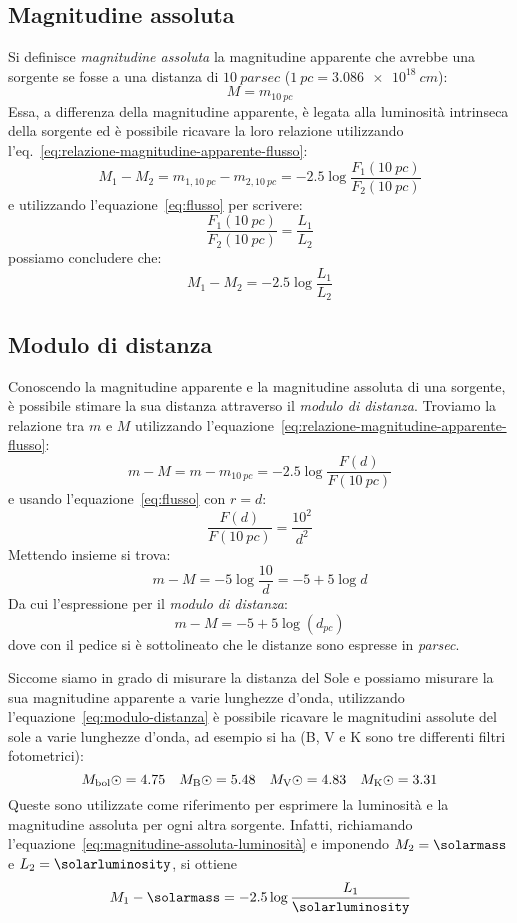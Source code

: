 \subsection{Magnitudine assoluta}\label{sec:magnitudine-assoluta}
Si definisce \emph{magnitudine assoluta} la magnitudine apparente che avrebbe una sorgente se fosse a una distanza di $\SI{10}{parsec}$ ($\SI{1}{pc} = \SI{3.086e18}{cm}$):
\begin{equation}\label{eq:magnitudine-assoluta}
    M = m_{\SI{10}{pc}}
\end{equation}
Essa, a differenza della magnitudine apparente, è legata alla luminosità intrinseca della sorgente ed è possibile ricavare la loro relazione utilizzando l'eq.~\eqref{eq:relazione-magnitudine-apparente-flusso}:
\[
    M_1 - M_2 = m_{1, \SI{10}{pc}} - m_{2, \SI{10}{pc}} = -2.5 \log\frac{F_1 (\SI{10}{pc})}{F_2 (\SI{10}{pc})}
\]
e utilizzando l'equazione~\eqref{eq:flusso} per scrivere:
\[
    \frac{F_1 (\SI{10}{pc})}{F_2 (\SI{10}{pc})} = \frac{L_1}{L_2}
\]
possiamo concludere che:
\begin{equation}\label{eq:magnitudine-assoluta-luminosità}
    M_1 - M_2 = -2.5 \log\frac{L_1}{L_2}
\end{equation}

\subsection{Modulo di distanza}
Conoscendo la magnitudine apparente e la magnitudine assoluta di una sorgente, è possibile stimare la sua distanza attraverso il \emph{modulo di distanza}. Troviamo la relazione tra $m$ e $M$ utilizzando l'equazione~\eqref{eq:relazione-magnitudine-apparente-flusso}:
\[
    m - M = m - m_{\SI{10}{pc}} = -2.5 \log\frac{F(d)}{F(\SI{10}{pc})}
\]
e usando l'equazione~\eqref{eq:flusso} con $r=d$:
\[
    \frac{F(d)}{F(\SI{10}{pc})} = \frac{10^2}{d^2}
\]
Mettendo insieme si trova:
\[
    m - M = -5 \log\frac{10}{d} = -5 + 5 \log d
\]
Da cui l'espressione per il \emph{modulo di distanza}:
\begin{equation}\label{eq:modulo-distanza}
    m - M = -5 + 5 \log(d_{\si{pc}})
\end{equation}
dove con il pedice si è sottolineato che le distanze sono espresse in \emph{parsec}.

Siccome siamo in grado di misurare la distanza del Sole e possiamo misurare la sua magnitudine apparente a varie lunghezze d'onda, utilizzando l'equazione~\eqref{eq:modulo-distanza} è possibile ricavare le magnitudini assolute del sole a varie lunghezze d'onda, ad esempio si ha (B, V e K sono tre differenti filtri fotometrici):
\[
    M_\ensuremath{\textup{bol}\odot} = 4.75 \quad M_\ensuremath{\textup{B}\odot} = 5.48 \quad M_\ensuremath{\textup{V}\odot} = 4.83 \quad M_\ensuremath{\textup{K}\odot} = 3.31
\]
Queste sono utilizzate come riferimento per esprimere la luminosità e la magnitudine assoluta per ogni altra sorgente. Infatti, richiamando l'equazione~\eqref{eq:magnitudine-assoluta-luminosità} e imponendo $M_2 = \si{\solarmass}$ e $L_2 = \si{\solarluminosity}$, si ottiene
\begin{equation}\label{eq:magnitudine-assoluta-luminosità-sole}
    M_1 - \si{\solarmass} = -2.5 \log\frac{L_1}{\si{\solarluminosity}}
\end{equation}